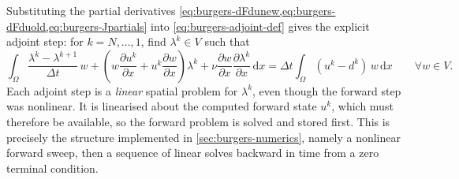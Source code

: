\documentclass[a4paper,11pt]{article}
\newcommand{\Om}{\Omega}
\newcommand{\dx}{\,\mathrm{d}x}
\theoremstyle{spacedplain} \newtheorem{theorem}[counter]{Theorem} \newtheorem{lemma}[counter]{Lemma} \newtheorem{prop}[counter]{Proposition} \newtheorem{cor}[counter]{Corollary}
\theoremstyle{spaceddefinition} \newtheorem{defn}[counter]{Definition} \newtheorem{example}[counter]{Example} \newtheorem{remark}[counter]{Remark}
\begin{document}
Substituting the partial derivatives \cref{eq:burgers-dFdunew,eq:burgers-dFduold,eq:burgers-Jpartials} into \cref{eq:burgers-adjoint-def} gives the explicit adjoint step: for $k = N, \ldots, 1$, find $\lambda^k \in V$ such that
\begin{equation}
  \label{eq:burgers-adjoint-weak}
  \int_{\Om}
  \frac{\lambda^k - \lambda^{k+1}}{\Delta t}\, w
  + \left( w \frac{\partial u^k}{\partial x}
           + u^k \frac{\partial w}{\partial x} \right) \lambda^k
  + \nu \frac{\partial w}{\partial x} \frac{\partial \lambda^k}{\partial x}
  \dx
  = \Delta t \int_{\Om} (u^k - d^k)\, w \dx
  \qquad \forall w \in V.
\end{equation}
Each adjoint step is a \emph{linear} spatial problem for $\lambda^k$, even though the forward step was nonlinear. It is linearised about the computed forward state $u^k$, which must therefore be available, so the forward problem is solved and stored first. This is precisely the structure implemented in \cref{sec:burgers-numerics}, namely a nonlinear forward sweep, then a sequence of linear solves backward in time from a zero terminal condition.
\end{document}

